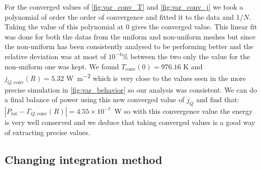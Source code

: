 For the converged values of \autoref{fig:var_conv_T} and \autoref{fig:var_conv_j} we took a polynomial of order the order of convergence and fitted it to the data and $1/N$. Taking the value of this polynomial at $0$ gives the converged value. This linear fit was done for both the datas from the uniform and non-uniform meshes but since the non-uniform has been consistently analysed to be performing better and the relative deviation was at most of $10^{-4}$\% between the two only the value for the non-uniform one was kept. We found $T_\mathrm{conv}(0) = 976.16$ \si{\kelvin} and $j_{Q,\mathrm{conv}}(R) = 5.32$ \si{\watt\per\meter\squared} which is very close to the values seen in the more precise simulation in \autoref{fig:var_behavior} so our analysis was consistent. We can do a final balance of power using this new converged value of $j_Q$ and find that: \hbox{$|P_\mathrm{tot} - \Gamma_{Q,\mathrm{conv}}(R)| = 4.55 \times 10^{-7}$ \si{\watt}} so with this convergence value the energy is very well conserved and we deduce that taking converged values is a good way of extracting precise values.

\subsection{Changing integration method}

